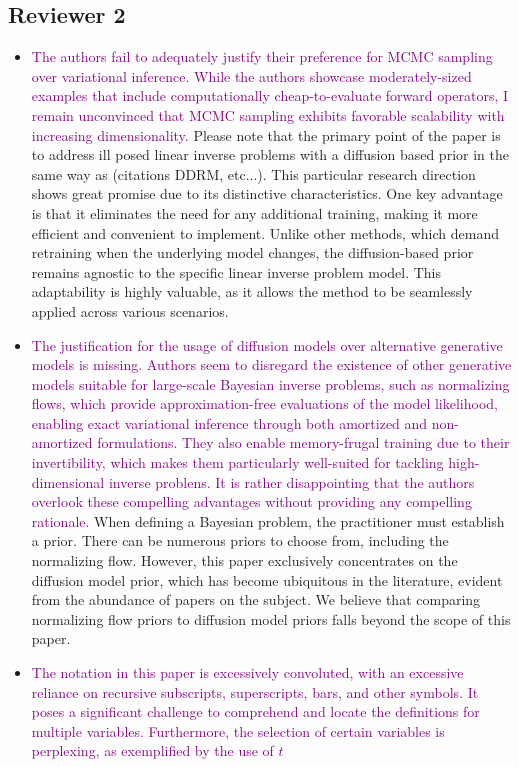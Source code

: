 \documentclass{article}
\newcommand{\question}[1]{\textcolor{purple}{#1}}
\begin{document}
\subsection*{Reviewer 2}
\begin{itemize}
    \item \question{The authors fail to adequately justify their preference for MCMC sampling over variational inference. While the authors showcase moderately-sized examples that include computationally cheap-to-evaluate forward operators, I remain unconvinced that MCMC sampling exhibits favorable scalability with increasing dimensionality.} Please note that the primary point of the paper is to address ill posed linear inverse problems with a diffusion based prior in the same way as (citations DDRM, etc...). This particular research direction shows great promise due to its distinctive characteristics. One key advantage is that it eliminates the need for any additional training, making it more efficient and convenient to implement. Unlike other methods, which demand retraining when the underlying model changes, the diffusion-based prior remains agnostic to the specific linear inverse problem model. This adaptability is highly valuable, as it allows the method to be seamlessly applied across various scenarios.
    \item \question{The justification for the usage of diffusion models over alternative generative models is missing. Authors seem to disregard the existence of other generative models suitable for large-scale Bayesian inverse problems, such as normalizing flows, which provide approximation-free evaluations of the model likelihood, enabling exact variational inference through both amortized and non-amortized formulations. They also enable memory-frugal training due to their invertibility, which makes them particularly well-suited for tackling high-dimensional inverse problens. It is rather disappointing that the authors overlook these compelling advantages without providing any compelling rationale.} When defining a Bayesian problem, the practitioner must establish a prior. There can be numerous priors to choose from, including the normalizing flow. However, this paper exclusively concentrates on the diffusion model prior, which has become ubiquitous in the literature, evident from the abundance of papers on the subject. We believe that comparing normalizing flow priors to diffusion model priors falls beyond the scope of this paper.
    \item \question{The notation in this paper is excessively convoluted, with an excessive reliance on recursive subscripts, superscripts, bars, and other symbols. It poses a significant challenge to comprehend and locate the definitions for multiple variables. Furthermore, the selection of certain variables is perplexing, as exemplified by the use of $t$
}
\end{itemize}
\end{document}
